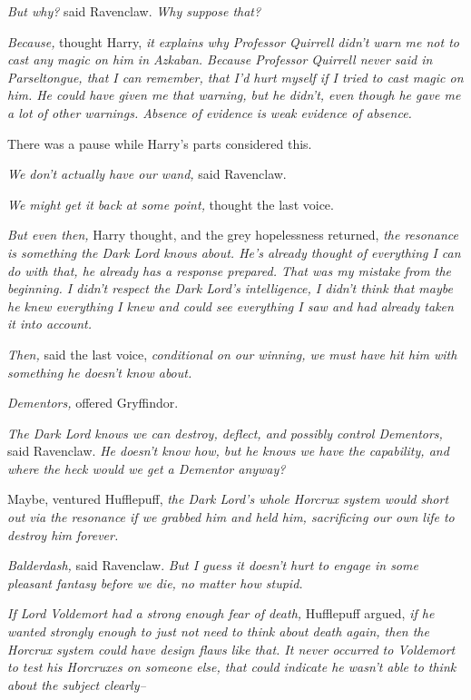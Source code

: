 \emph{But why?} said Ravenclaw. \emph{Why suppose that?}

\emph{Because,} thought Harry, \emph{it explains why Professor Quirrell didn't \emph{warn me} not to cast any magic on him in Azkaban. Because Professor Quirrell never said in Parseltongue, that I can remember, that I'd hurt myself if I tried to cast magic on him. He could have given me that warning, but he didn't, even though he gave me a lot of other warnings. Absence of evidence is weak evidence of absence.}

There was a pause while Harry's parts considered this.

\emph{We don't actually have our wand,} said Ravenclaw.

\emph{We might get it back at some point,} thought the last voice.

\emph{But even then,} Harry thought, and the grey hopelessness returned, \emph{the resonance is something the Dark Lord knows about. He's already thought of everything I can do with that, he already has a response prepared. That was my mistake from the beginning. I didn't respect the Dark Lord's intelligence, I didn't think that maybe he knew everything I knew and could see everything I saw and had already taken it into account.}

\emph{Then,} said the last voice, \emph{conditional on our winning, we must have hit him with something he doesn't know about.}

\emph{Dementors,} offered Gryffindor.

\emph{The Dark Lord \emph{knows} we can destroy, deflect, and possibly control Dementors,} said Ravenclaw. \emph{He doesn't know how, but he knows we have the capability, and where the heck would we get a Dementor anyway?}

Maybe, ventured Hufflepuff, \emph{the Dark Lord's whole Horcrux system would short out via the resonance if we grabbed him and held him, sacrificing our own life to destroy him forever.}

\emph{Balderdash,} said Ravenclaw. \emph{But I guess it doesn't hurt to engage in some pleasant fantasy before we die, no matter how stupid.}

\emph{If Lord Voldemort had a strong enough fear of death,} Hufflepuff argued, \emph{if he wanted strongly enough to just not need to think about death again, then the Horcrux system \emph{could} have design flaws like that. It never occurred to Voldemort to test his Horcruxes on someone else, that could indicate he wasn't able to think about the subject clearly\---}

